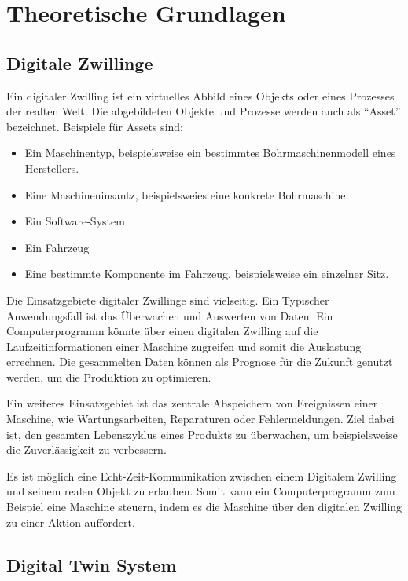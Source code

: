 \chapter{Theoretische Grundlagen}
\fancyhfStyleContent{}


\section{Digitale Zwillinge}

Ein digitaler Zwilling ist ein virtuelles Abbild eines Objekts oder eines Prozesses der realten Welt. Die abgebildeten Objekte und Prozesse werden auch als "`Asset"' bezeichnet. Beispiele für Assets sind:
\begin{itemize}
	\item Ein Maschinentyp, beispielsweise ein bestimmtes Bohrmaschinenmodell eines Herstellers.
	\item Eine Maschineninsantz, beispielsweies eine konkrete Bohrmaschine.
	\item Ein Software-System
	\item Ein Fahrzeug
	\item Eine bestimmte Komponente im Fahrzeug, beispielsweise ein einzelner Sitz.
\end{itemize}

Die Einsatzgebiete digitaler Zwillinge sind vielseitig. Ein Typischer Anwendungsfall ist das Überwachen und Auswerten von Daten. Ein Computerprogramm könnte über einen digitalen Zwilling auf die Laufzeitinformationen einer Maschine zugreifen und somit die Auslastung errechnen. Die gesammelten Daten können als Prognose für die Zukunft genutzt werden, um die Produktion zu optimieren.

Ein weiteres Einsatzgebiet ist das zentrale Abspeichern von Ereignissen einer Maschine, wie Wartungsarbeiten, Reparaturen oder Fehlermeldungen. Ziel dabei ist, den gesamten Lebenszyklus eines Produkts zu überwachen, um beispielsweise die Zuverlässigkeit zu verbessern.

Es ist möglich eine Echt-Zeit-Kommunikation zwischen einem Digitalem Zwilling und seinem realen Objekt zu erlauben. Somit kann ein Computerprogramm zum Beispiel eine Maschine steuern, indem es die Maschine über den digitalen Zwilling zu einer Aktion auffordert.



\section{Digital Twin System}


